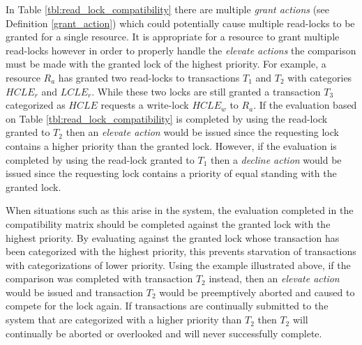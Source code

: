 \documentclass[conference]{IEEEtran}
\begin{document}
In Table \ref{tbl:read_lock_compatibility} there are multiple \textit{grant actions} (see Definition \ref{grant_action}) which could potentially cause multiple read-locks to be granted for a single resource. It is appropriate for a resource to grant multiple read-locks however in order to properly handle the \textit{elevate actions} the comparison must be made with the granted lock of the highest priority. For example, a resource $R_{a}$ has granted two read-locks to transactions $T_{1}$ and $T_{2}$ with categories $HCLE_{r}$ and $LCLE_{r}$. While these two locks are still granted a transaction $T_{3}$ categorized as $HCLE$ requests a write-lock $HCLE_{w}$ to $R_{a}$. If the evaluation based on Table \ref{tbl:read_lock_compatibility} is completed by using the read-lock granted to $T_{2}$ then an \textit{elevate action} would be issued since the requesting lock contains a higher priority than the granted lock. However, if the evaluation is completed by using the read-lock granted to $T_{1}$ then a \textit{decline action} would be issued since the requesting lock contains a priority of equal standing with the granted lock.

When situations such as this arise in the system, the evaluation completed  in the compatibility matrix should be completed against the granted lock with the highest priority. By evaluating against the granted lock whose transaction has been categorized with the highest priority, this prevents starvation of transactions with categorizations of lower priority. Using the example illustrated above, if the comparison was completed with transaction $T_{2}$ instead, then an \textit{elevate action} would be issued and transaction $T_{2}$ would be preemptively aborted and caused to compete for the lock again. If transactions are continually submitted to the system that are categorized with a higher priority than $T_{2}$ then $T_{2}$ will continually be aborted or overlooked and will never successfully complete.
\end{document}
